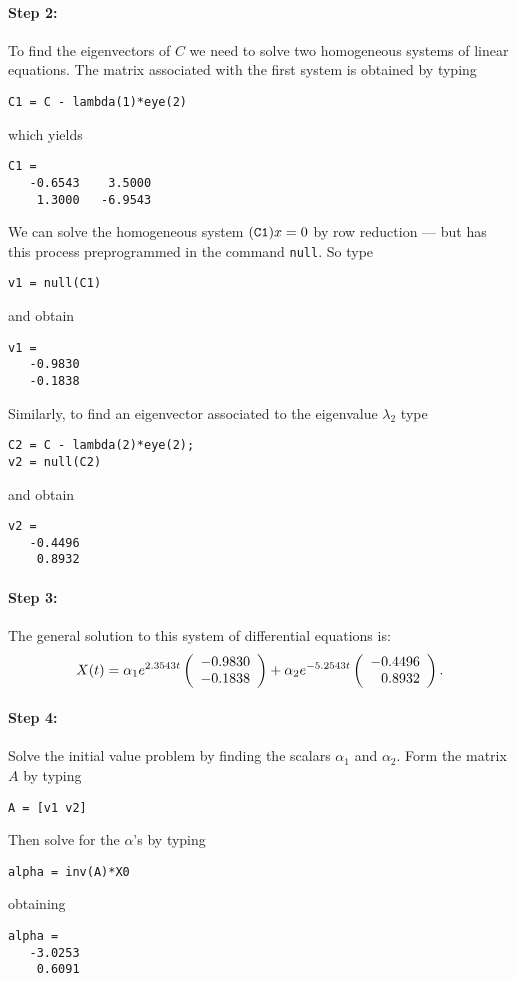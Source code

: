 \documentclass{ximera}
\begin{document}
\paragraph{Step 2:}  To find the eigenvectors of $C$ we need to solve
two homogeneous systems of linear equations.
The matrix associated with the first system is obtained by typing
\begin{verbatim}
C1 = C - lambda(1)*eye(2)
\end{verbatim}
which yields
\begin{verbatim}
C1 =
   -0.6543    3.5000
    1.3000   -6.9543
\end{verbatim}
We can solve the homogeneous system $({\tt C1})x=0$ by row reduction --- but 
\Matlab has this process preprogrammed in the command {\tt null}. 
  So type
\begin{verbatim}
v1 = null(C1)
\end{verbatim}
and obtain
\begin{verbatim}
v1 =
   -0.9830
   -0.1838
\end{verbatim}
Similarly, to find an eigenvector associated to the eigenvalue $\lambda_2$
type
\begin{verbatim}
C2 = C - lambda(2)*eye(2);
v2 = null(C2)
\end{verbatim}
and obtain
\begin{verbatim}
v2 =
   -0.4496
    0.8932
\end{verbatim}


\paragraph{Step 3:}  The general solution to this system of differential
equations is:
\[
X(t) = \alpha_1 e^{2.3543t}\left(\begin{array}{r} -0.9830 \\ -0.1838\end{array}\right) +
\alpha_2e^{-5.2543t}\left(\begin{array}{r} -0.4496 \\ 0.8932\end{array}\right).
\]


\paragraph{Step 4:}  Solve the initial value problem by finding the scalars
$\alpha_1$ and $\alpha_2$.   Form the matrix $A$ by typing
\begin{verbatim}
A = [v1 v2]
\end{verbatim}
Then solve for the $\alpha$'s by typing
\begin{verbatim}
alpha = inv(A)*X0
\end{verbatim}
obtaining
\begin{verbatim}
alpha =
   -3.0253
    0.6091
\end{verbatim}
\end{document}

